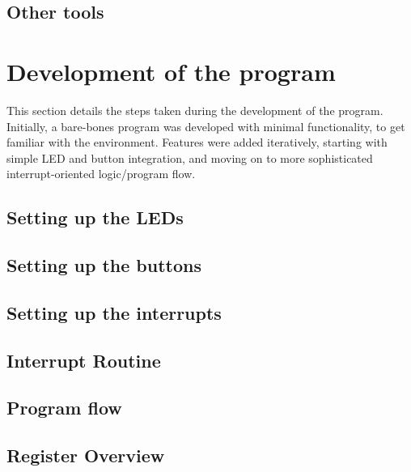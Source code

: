     \subsection{Other tools}

        

\section{Development of the program}

This section details the steps taken during the development of the program.
Initially, a bare-bones program was developed with minimal functionality, to get familiar with the environment.
Features were added iteratively, starting with simple LED and button integration, and moving on to more sophisticated interrupt-oriented logic/program flow.

    \subsection{Setting up the LEDs}
        
        

    \subsection{Setting up the buttons}

        

    \subsection{Setting up the interrupts}

        

    \subsection{Interrupt Routine}

        

    \subsection{Program flow}

        

        \newpage

    \subsection{Register Overview}

        

